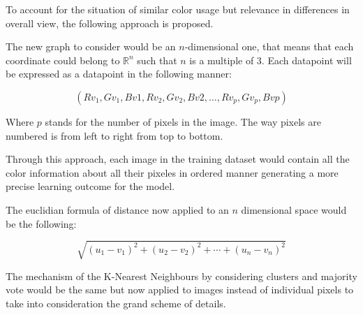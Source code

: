 \documentclass[12pt]{article}
\begin{document}
To account for the situation of similar color usage but relevance in differences in overall view, the following approach is proposed.

The new graph to consider would be an $n$-dimensional one, that means that each coordinate could belong to $\mathbb{R}^{n}$ such that $n$ is a multiple of 3.
Each datapoint will be expressed as a datapoint in the following manner:

\begin{equation}
    (Rv_{1},Gv_{1},Bv{1},Rv_{2},Gv_{2},Bv{2},\ldots,Rv_{p},Gv_{p},Bv{p})
\end{equation}

Where $p$ stands for the number of pixels in the image. The way pixels are numbered is from left to right from top to bottom.

Through this approach, each image in the training dataset would contain all the color information about all their pixeles in ordered manner generating a more precise learning outcome for the model.

The euclidian formula of distance now applied to an $n$ dimensional space would be the following:

\begin{equation}
    \sqrt{(u_1-v_1)^2+(u_2-v_2)^2+\cdots+(u_n-v_n)^2}
\end{equation}

The mechanism of the K-Nearest Neighbours by considering clusters and majority vote would be the same but now applied to images instead of individual pixels to take into consideration the grand scheme of details.
\end{document}
